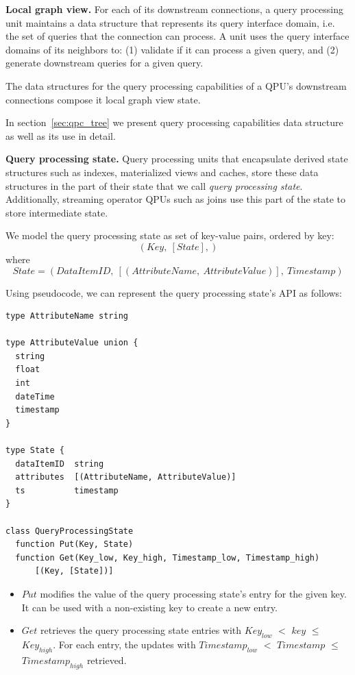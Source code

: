 \medskip
\noindent
\textbf{Local graph view.}
For each of its downstream connections, a query processing unit maintains a data structure that represents
its query interface domain, i.e. the set of queries that the connection can process.
A unit uses the query interface domains of its neighbors to:
(1) validate if it can process a given query, and
(2) generate downstream queries for a given query.

The data structures for the query processing capabilities of a QPU's downstream connections compose it local graph view
state.

In section~\ref{sec:qpc_tree} we present query processing capabilities data structure as well as its use in detail.

\medskip
\noindent
\textbf{Query processing state.}
Query processing units that encapsulate derived state structures such as indexes, materialized views and
caches, store these data structures in the part of their state that we call \textit{query processing state}.
Additionally, streaming operator QPUs such as joins use this part of the state to store intermediate state.

We model the query processing state as set of key-value pairs, ordered by key:
\[
  (Key,~[State],)
\]
where
\[
  State = (DataItemID,~[(AttributeName,~AttributeValue)],~Timestamp)
\]


Using pseudocode, we can represent the query processing state's API as follows:

\todo{}
\begin{lstlisting}[caption={Pseudocode for the QPU's query processing state},captionpos=b,label={lst:qpustate}, frame=tlrb]
type AttributeName string

type AttributeValue union {
  string
  float
  int
  dateTime
  timestamp
}

type State {
  dataItemID  string
  attributes  [(AttributeName, AttributeValue)]
  ts          timestamp
}

class QueryProcessingState
  function Put(Key, State)
  function Get(Key_low, Key_high, Timestamp_low, Timestamp_high)
      [(Key, [State])]
\end{lstlisting}

\begin{itemize}
  \item $Put$ modifies the value of the query processing state's entry for the given key.
  It can be used with a non-existing key to create a new entry.

  \item $Get$ retrieves the query processing state entries with $Key_{low}$ $<$ $key$ $\leq$ $Key_{high}$.
  For each entry, the updates with $Timestamp_{low}$ $<$ $Timestamp$ $\leq$ $Timestamp_{high}$ retrieved.
\end{itemize}

